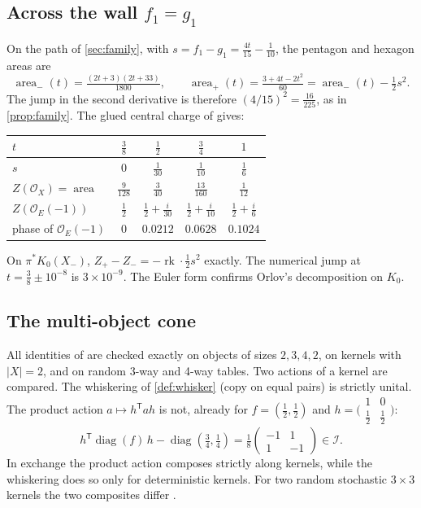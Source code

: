 \documentclass[11pt]{article}
\theoremstyle{definition}
\theoremstyle{remark}
\begin{document}
\subsection{Across the wall $f_1=g_1$}\label{sec:openwall}
On the path of \cref{sec:family}, with $s=f_1-g_1=\frac{4t}{15}-\frac1{10}$, the pentagon and hexagon areas are
\[
\operatorname{area}_-(t)=\tfrac{(2t+3)(2t+33)}{1800},\qquad \operatorname{area}_+(t)=\tfrac{3+4t-2t^2}{60}=\operatorname{area}_-(t)-\tfrac12s^2.
\]
The jump in the second derivative is therefore $(4/15)^2=\frac{16}{225}$, as in \cref{prop:family}. The glued central charge
of \cite[Def.~10.7]{Conditionals} gives:
\begin{center}\small
\begin{tabular}{@{}lcccc@{}}
\toprule
$t$ & $\tfrac38$ & $\tfrac12$ & $\tfrac34$ & $1$\\
\midrule
$s$ & $0$ & $\tfrac1{30}$ & $\tfrac1{10}$ & $\tfrac16$\\
$Z(\mathcal O_X)=\operatorname{area}$ & $\tfrac9{128}$ & $\tfrac3{40}$ & $\tfrac{13}{160}$ & $\tfrac1{12}$\\
$Z(\mathcal O_E(-1))$ & $\tfrac12$ & $\tfrac12+\tfrac i{30}$ & $\tfrac12+\tfrac i{10}$ & $\tfrac12+\tfrac i6$\\
phase of $\mathcal O_E(-1)$ & $0$ & $0.0212$ & $0.0628$ & $0.1024$\\
\bottomrule
\end{tabular}
\end{center}
On $\pi^*K_0(X_-)$, $Z_+-Z_-=-\operatorname{rk}\cdot\frac12s^2$ exactly. The numerical jump at $t=\frac38\pm10^{-8}$ is
$3\times10^{-9}$. The Euler form confirms Orlov's decomposition on $K_0$.

\subsection{The multi-object cone}\label{sec:opencone}
All identities of \cite[Thm.~10.2, Prop.~10.4]{Conditionals} are checked exactly on objects of sizes $2,3,4,2$, on kernels
with $\lvert X\rvert=2$, and on random 3-way and 4-way tables. Two actions of a kernel are compared. The whiskering of
\cref{def:whisker} (copy on equal pairs) is strictly unital. The product action $a\mapsto h^{\mathsf T}ah$ is not, already for
$f=(\frac12,\frac12)$ and $h=\bigl(\begin{smallmatrix}1&0\\ \frac12&\frac12\end{smallmatrix}\bigr)$:
\[
h^{\mathsf T}\operatorname{diag}(f)\,h-\operatorname{diag}(\tfrac34,\tfrac14)
=\tfrac18\begin{pmatrix}-1&1\\1&-1\end{pmatrix}\in\mathcal I.
\]
In exchange the product action composes strictly along kernels, while the whiskering does so only for deterministic
kernels. For two random stochastic $3\times3$ kernels the two composites differ \cite[Thm.~10.2(iv)]{Conditionals}.
\end{document}
